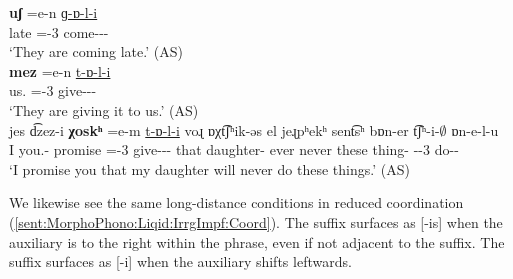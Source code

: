 \begin{exe}
	\ex\label{sent:MorphoPhono:Liqid:IrrgImpf:AS}
	\begin{xlist}
		\ex \gll \textbf{uʃ}  \colorbox{lsLightGray}{=e-n}   \uline{ɡ-ɒ-l-i}
		\\
		late ={\auxgloss}-3{\pl} come-{\thgloss}-{\infgloss}-{\impfcvb} 
		\\
		\trans `They are coming late.' \hfill (AS)
		\\
		\ex \gll \textbf{mez}  \colorbox{lsLightGray}{=e-n}   \uline{t-ɒ-l-i}
		\\
		us.{\dat} ={\auxgloss}-3{\pl} give-{\thgloss}-{\infgloss}-{\impfcvb} 
		\\
		\trans `They are giving it to us.' \hfill (AS)
		\\
		\ex \gll jes d͡zez-i \textbf{χoskʰ}  \colorbox{lsLightGray}{=e-m}   \uline{t-ɒ-l-i} voɻ ɒχt͡ʃʰik-əs el jeɻpʰekʰ sent͡sʰ bɒn-er t͡ʃʰ-i-$\emptyset$ ɒn-e-l-u
		\\
		I you.{\pl}-{\dat} promise ={\auxgloss}-3{\pl} give-{\thgloss}-{\infgloss}-{\impfcvb} that daughter-{\possFsg}  ever never these thing-{\pl} {\neggloss}-{\auxgloss}-3{\sg} do{\thgloss}-{\infgloss}-{\futcvb}
		\\
		\trans `I promise you that my daughter will never do these things.'  \hfill (AS)
		\\
	\end{xlist}
\end{exe}




We likewise see the same long-distance conditions in reduced coordination (\ref{sent:MorphoPhono:Liqid:IrrgImpf:Coord}). The suffix surfaces as [-is] when the auxiliary is to the right within the phrase, even if not adjacent to the suffix. The suffix surfaces as [-i] when the auxiliary shifts leftwards.\largerpage


